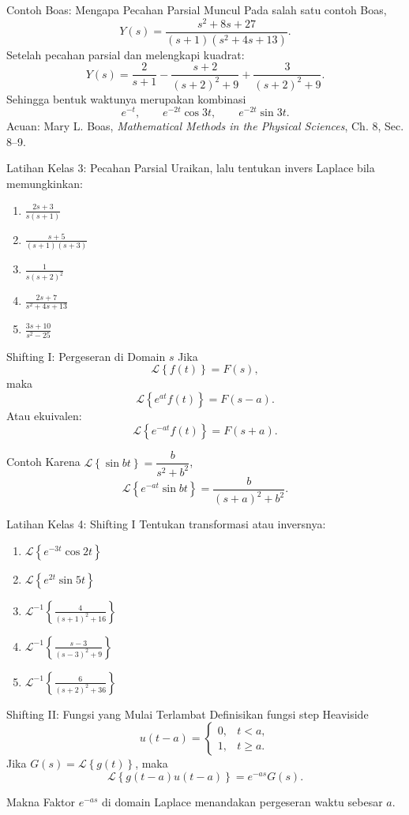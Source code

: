 \documentclass[aspectratio=169,10pt]{beamer}
\newcommand{\Lcal}{\mathcal{L}}
\newcommand{\Lap}[1]{\Lcal\left\{#1\right\}}
\newcommand{\invLap}[1]{\Lcal^{-1}\left\{#1\right\}}
\newcommand{\boasnote}{\scriptsize\color{iteraGray}Acuan: Mary L. Boas, \textit{Mathematical Methods in the Physical Sciences}, Ch. 8, Sec. 8--9.}
\begin{document}
\begin{frame}{Contoh Boas: Mengapa Pecahan Parsial Muncul}
Pada salah satu contoh Boas,
\[
Y(s)=\frac{s^2+8s+27}{(s+1)(s^2+4s+13)}.
\]
Setelah pecahan parsial dan melengkapi kuadrat:
\[
Y(s)=\frac{2}{s+1}
-\frac{s+2}{(s+2)^2+9}
+\frac{3}{(s+2)^2+9}.
\]
Sehingga bentuk waktunya merupakan kombinasi
\[
e^{-t},\qquad e^{-2t}\cos 3t,\qquad e^{-2t}\sin 3t.
\]
\vfill
\boasnote
\end{frame}

\begin{frame}{Latihan Kelas 3: Pecahan Parsial}
Uraikan, lalu tentukan invers Laplace bila memungkinkan:
\begin{enumerate}
\item $\displaystyle \frac{2s+3}{s(s+1)}$
\item $\displaystyle \frac{s+5}{(s+1)(s+3)}$
\item $\displaystyle \frac{1}{s(s+2)^2}$
\item $\displaystyle \frac{2s+7}{s^2+4s+13}$
\item $\displaystyle \frac{3s+10}{s^2-25}$
\end{enumerate}
\end{frame}

\begin{frame}{Shifting I: Pergeseran di Domain $s$}
Jika
\[
\Lap{f(t)}=F(s),
\]
maka
\[
\boxed{\Lap{e^{at}f(t)}=F(s-a)}.
\]
Atau ekuivalen:
\[
\boxed{\Lap{e^{-at}f(t)}=F(s+a)}.
\]
\begin{exampleblock}{Contoh}
Karena $\Lap{\sin bt}=\dfrac{b}{s^2+b^2}$,
\[
\Lap{e^{-at}\sin bt}
=\frac{b}{(s+a)^2+b^2}.
\]
\end{exampleblock}
\end{frame}

\begin{frame}{Latihan Kelas 4: Shifting I}
Tentukan transformasi atau inversnya:
\begin{enumerate}
\item $\Lap{e^{-3t}\cos 2t}$
\item $\Lap{e^{2t}\sin 5t}$
\item $\displaystyle \invLap{\frac{4}{(s+1)^2+16}}$
\item $\displaystyle \invLap{\frac{s-3}{(s-3)^2+9}}$
\item $\displaystyle \invLap{\frac{6}{(s+2)^2+36}}$
\end{enumerate}
\end{frame}

\begin{frame}{Shifting II: Fungsi yang Mulai Terlambat}
Definisikan fungsi step Heaviside
\[
u(t-a)=\begin{cases}
0,& t<a,\\
1,& t\ge a.
\end{cases}
\]
Jika $G(s)=\Lap{g(t)}$, maka
\[
\boxed{\Lap{g(t-a)u(t-a)}=e^{-as}G(s)}.
\]
\begin{block}{Makna}
Faktor $e^{-as}$ di domain Laplace menandakan pergeseran waktu sebesar $a$.
\end{block}
\end{frame}
\end{document}
